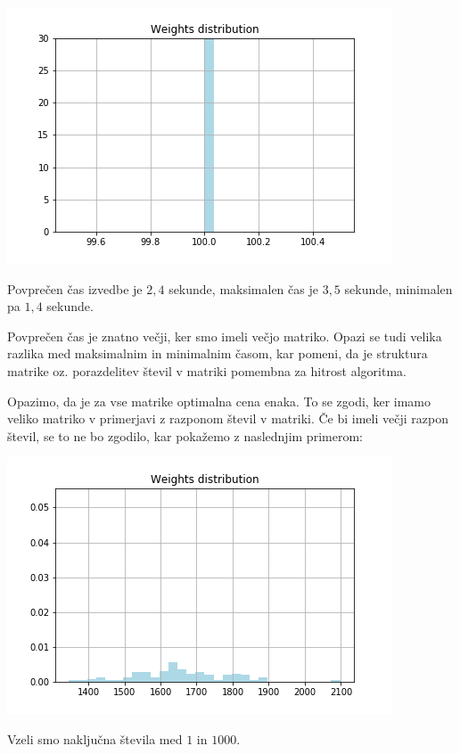 \documentclass[a4paper, 12pt]{article}
\begin{document}
\includegraphics[width=\textwidth]{../slike/picture111min.png}

Povprečen čas izvedbe je $2,4$ sekunde, maksimalen čas je $3,5$ sekunde, minimalen pa $1,4$
sekunde.

Povprečen čas je znatno večji, ker smo imeli večjo matriko. Opazi se tudi velika razlika med
maksimalnim in minimalnim časom, kar pomeni, da je struktura matrike oz. porazdelitev 
števil v matriki pomembna za hitrost algoritma.

Opazimo, da je za vse matrike optimalna cena enaka. To se zgodi, ker imamo veliko 
matriko v primerjavi z razponom števil v matriki. Če bi imeli večji razpon števil,
se to ne bo zgodilo, kar pokažemo z naslednjim primerom:

\includegraphics[width=\textwidth]{../slike/picture1101min.png}

Vzeli smo naključna števila med $1$ in $1000$.
\end{document}
